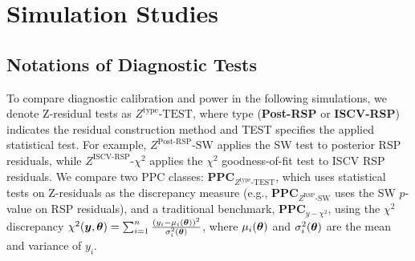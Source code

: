 

\section{Simulation Studies}\label{simulation}

\subsection{Notations of Diagnostic Tests}

To compare diagnostic calibration and power in the following simulations, we denote Z-residual tests as $Z^{\text{type}}\text{-TEST}$, where type (\textbf{Post-RSP} or \textbf{ISCV-RSP}) indicates the residual construction method and TEST specifies the applied statistical test. For example, $Z^{\text{Post-RSP}}\text{-SW}$ applies the SW test to posterior RSP residuals, while $Z^{\text{ISCV-RSP}}\text{-}\chi^2$ applies the $\chi^2$ goodness-of-fit test to ISCV RSP residuals.  We compare two PPC classes: $\textbf{PPC}_{Z^{\text{type}}\text{-TEST}}$, which uses statistical tests on Z-residuals as the discrepancy measure (e.g., $\textbf{PPC}_{Z^{\text{RSP}}\text{-SW}}$ uses the SW $p$-value on RSP residuals), and a traditional benchmark, $\textbf{PPC}_{y-\chi^2}$, using the $\chi^2$ discrepancy $\chi^2(\bm{y},\bm{\theta}) = \sum_{i=1}^n \frac{(y_i-\mu_i(\bm{\theta}))^2}{\sigma_i^2(\bm{\theta})}$, where $\mu_i(\bm{\theta})$ and $\sigma_i^2(\bm{\theta})$ are the mean and variance of $y_i$.


